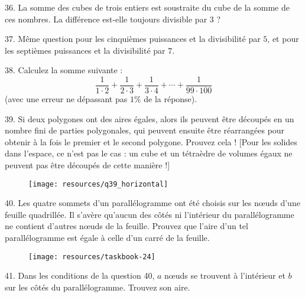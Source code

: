 \begin{problem}{36.}
	La somme des cubes de trois entiers est soustraite du cube de la somme de
	ces nombres. La différence est-elle toujours divisible par $3$ ?
\end{problem}

\begin{problem}{37.}
	Même question pour les cinquièmes puissances et la divisibilité par $5$, et
	pour les septièmes puissances et la divisibilité par $7$.
\end{problem}

\begin{problem}{38.}
	Calculez la somme suivante :
	\begin{equation*}
		\frac{1}{1\cdot 2} + \frac{1}{2\cdot 3} + \frac{1}{3\cdot 4} + \dotsb + \frac{1}{99\cdot 100}
	\end{equation*}
	(avec une erreur ne dépassant pas $1\%$ de la réponse).
\end{problem}

\begin{problem}{39.}
	Si deux polygones ont des aires égales, alors ils peuvent être découpés en
	un nombre fini de parties polygonales, qui peuvent ensuite être réarrangées
	pour obtenir à la fois le premier et le second polygone. Prouvez cela !
	[Pour les solides dans l’espace, ce n’est pas le cas : un cube et un
	tétraèdre de volumes égaux ne peuvent pas être découpés de cette manière !]
	\begin{figure}
		\texttt{[image: resources/q39\_horizontal]}
	\end{figure}
\end{problem}

\begin{problem}{40.}
	Les quatre sommets d’un parallélogramme ont été choisis sur les nœuds d’une
	feuille quadrillée. Il s’avère qu’aucun des côtés ni l’intérieur du
	parallélogramme ne contient d’autres nœuds de la feuille. Prouvez que l’aire
	d’un tel parallélogramme est égale à celle d’un carré de la feuille.
	\begin{figure}
		\texttt{[image: resources/taskbook-24]}
	\end{figure}
\end{problem}

\begin{problem}{41.}
	Dans les conditions de la question 40, $a$ nœuds se trouvent à l’intérieur
	et $b$ sur les côtés du parallélogramme. Trouvez son aire.
\end{problem}

